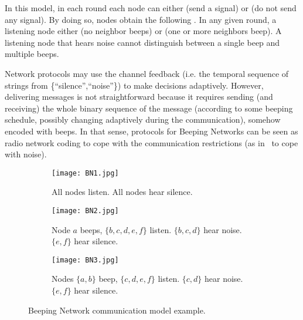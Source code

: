\vspace*{-0.95ex}
In this model, 
in each round each node can either  (send a signal) or  (do not send any signal). 
By doing so, nodes obtain the following . 
In any given round, a listening node  either  (no neighbor beeps) or  (one or more neighbors beep).
A listening node that hears noise cannot distinguish between a single beep and multiple beeps. 

Network protocols may use the channel feedback
(i.e. the temporal sequence of strings from \{``silence'',``noise''\})
to make decisions adaptively.
However, delivering messages is not straightforward because it requires sending (and receiving) the whole binary sequence of the message (according to some beeping schedule, possibly changing adaptively during the communication), somehow encoded with beeps. In that sense, protocols for Beeping Networks can be seen as radio network coding to cope with the communication restrictions (as in~\cite{efremenko2018interactive} to cope with noise). 

\vspace*{-2ex}
\begin{figure}[th]
\centering
\begin{subfigure}[htbp]{0.3\textwidth}
\centering
\vspace*{-2ex}
\texttt{[image: BN1.jpg]}
\caption{All nodes listen. All nodes hear silence.}
\label{subfig:network}
\end{subfigure}
\hspace{0.1in}
\begin{subfigure}[htbp]{0.3\textwidth}
\centering
\texttt{[image: BN2.jpg]}
\caption{Node $a$ beeps, $\{b,c,d,e,f\}$ listen. $\{b,c,d\}$ hear noise. $\{e,f\}$ hear silence.}
\label{subfig:1beep}
\end{subfigure}
\hspace{0.1in}
\begin{subfigure}[htbp]{0.3\textwidth}
\centering
\vspace*{-0.2ex}
\texttt{[image: BN3.jpg]}
\caption{Nodes $\{a,b\}$ beep, $\{c,d,e,f\}$ listen. $\{c,d\}$ hear noise. $\{e,f\}$ hear silence.}
\label{subfig:2beep}
\end{subfigure}
\vspace*{-1.5ex}
\caption{Beeping Network communication model example.}
\vspace*{-1.5ex}
\label{fig:BNmodel}
\end{figure}

